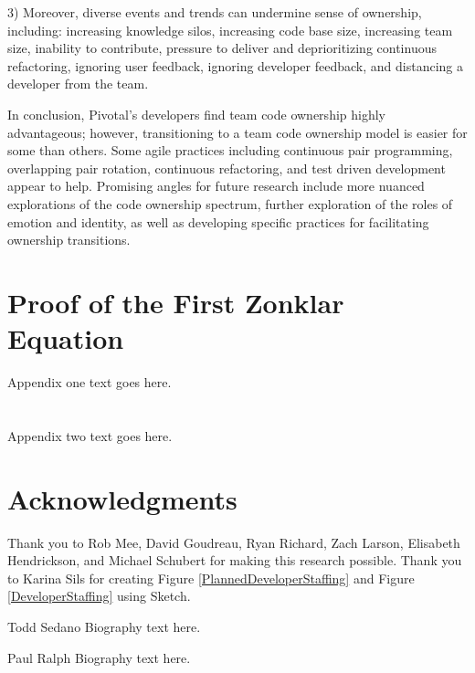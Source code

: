 3) Moreover, diverse events and trends can undermine sense of ownership, including:  increasing knowledge silos, increasing code base size, increasing team size, inability to contribute, pressure to deliver and deprioritizing continuous refactoring, ignoring user feedback, ignoring developer feedback, and distancing a developer from the team. 

In conclusion, Pivotal’s developers find team code ownership highly advantageous; however, transitioning to a team code ownership model is easier for some than others. Some agile practices including continuous pair programming, overlapping pair rotation, continuous refactoring, and test driven development appear to help. Promising angles for future research include more nuanced explorations of the code ownership spectrum, further exploration of the roles of emotion and identity, as well as developing specific practices for facilitating ownership transitions. 


\appendices
\section{Proof of the First Zonklar Equation}
Appendix one text goes here.

\section{}
Appendix two text goes here.

\section*{Acknowledgments}

Thank you to Rob Mee, David Goudreau, Ryan Richard, Zach Larson, Elisabeth Hendrickson, and Michael Schubert for making this research possible. Thank you to Karina Sils for creating Figure \ref{PlannedDeveloperStaffing} and Figure \ref{DeveloperStaffing} using Sketch.

\ifCLASSOPTIONcaptionsoff
  \newpage
\fi


 

\begin{IEEEbiography}{Todd Sedano}
Biography text here.
\end{IEEEbiography}

\begin{IEEEbiographynophoto}{Paul Ralph}
Biography text here.
\end{IEEEbiographynophoto}


